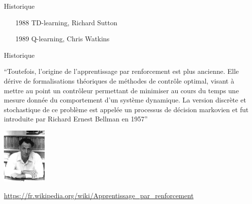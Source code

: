 \documentclass{beamer}
\begin{document}
\begin{frame}{Historique}
  \begin{itemize}
  \item[1988] TD-learning, Richard Sutton\hspace{1em}
    
  \item[1989] Q-learning,  Chris Watkins\hspace{1.8em}
    
  \end{itemize}
\end{frame}
  
\begin{frame}{Historique}

``Toutefois, l'origine de l'apprentissage par renforcement est plus
ancienne. Elle dérive de formalisations théoriques de méthodes de
contrôle optimal, visant à mettre au point un contrôleur permettant de
minimiser au cours du temps une mesure donnée du comportement d'un
système dynamique. La version discrète et stochastique de ce problème
est appelée un processus de décision markovien et fut introduite par
Richard Ernest Bellman en 1957''

\centering
\includegraphics[width=6em]{figs/Bellman.jpg}

\hfill \scriptsize \url{https://fr.wikipedia.org/wiki/Apprentissage_par_renforcement}

\end{frame}
\end{document}
